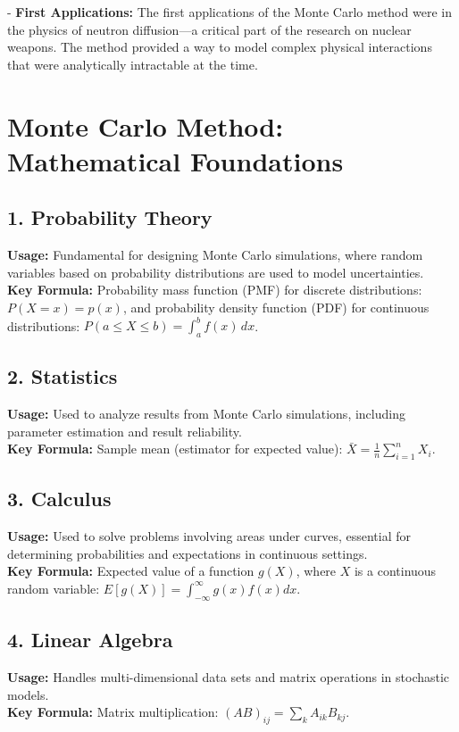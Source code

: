 \documentclass{article}
\begin{document}
- \textbf{First Applications:} The first applications of the Monte Carlo method were in the physics of neutron diffusion—a critical part of the research on nuclear weapons. The method provided a way to model complex physical interactions that were analytically intractable at the time.

\newpage
\section{Monte Carlo Method: Mathematical Foundations}

\subsection*{1. Probability Theory}
\textbf{Usage:} Fundamental for designing Monte Carlo simulations, where random variables based on probability distributions are used to model uncertainties.\\
\textbf{Key Formula:} Probability mass function (PMF) for discrete distributions: \( P(X = x) = p(x) \), and probability density function (PDF) for continuous distributions: \( P(a \leq X \leq b) = \int_a^b f(x) \, dx \).

\subsection*{2. Statistics}
\textbf{Usage:} Used to analyze results from Monte Carlo simulations, including parameter estimation and result reliability.\\
\textbf{Key Formula:} Sample mean (estimator for expected value): \( \bar{X} = \frac{1}{n} \sum_{i=1}^n X_i \).

\subsection*{3. Calculus}
\textbf{Usage:} Used to solve problems involving areas under curves, essential for determining probabilities and expectations in continuous settings.\\
\textbf{Key Formula:} Expected value of a function \( g(X) \), where \( X \) is a continuous random variable: \( E[g(X)] = \int_{-\infty}^\infty g(x)f(x)dx \).

\subsection*{4. Linear Algebra}
\textbf{Usage:} Handles multi-dimensional data sets and matrix operations in stochastic models.\\
\textbf{Key Formula:} Matrix multiplication: \( (AB)_{ij} = \sum_k A_{ik} B_{kj} \).
\end{document}
